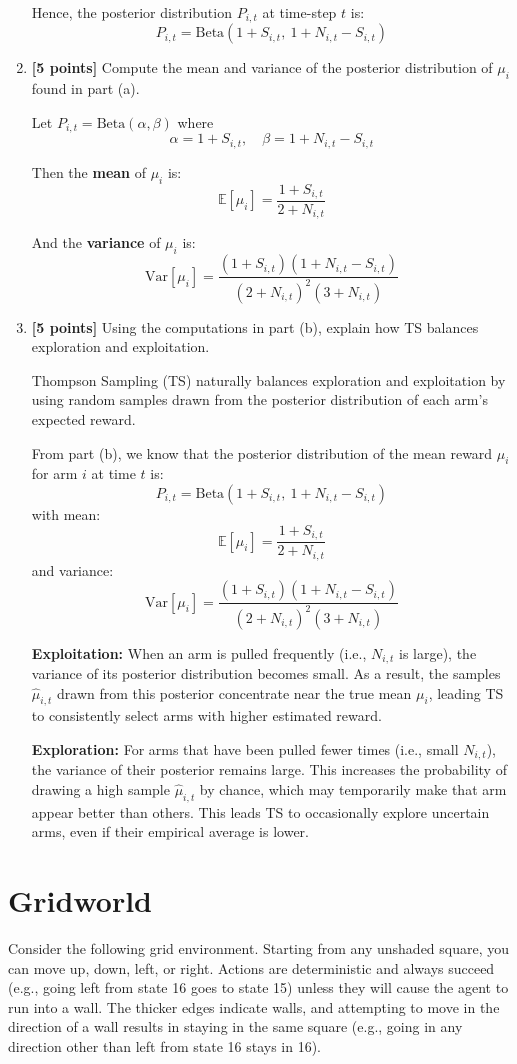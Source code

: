 \documentclass[a3paper,12pt]{extarticle} %
\begin{document}
\begin{enumerate}
Hence, the posterior distribution $P_{i,t}$ at time-step $t$ is:
\[
\boxed{
P_{i,t} = \text{Beta}(1 + S_{i,t},\ 1 + N_{i,t} - S_{i,t})
}
\]


    \item \textbf{[5 points]} Compute the mean and variance of the posterior distribution of $\mu_i$ found in part (a).

Let $P_{i,t} = \text{Beta}(\alpha, \beta)$ where
\[
\alpha = 1 + S_{i,t}, \quad \beta = 1 + N_{i,t} - S_{i,t}
\]

Then the \textbf{mean} of $\mu_i$ is:
\[
\mathbb{E}[\mu_i] = \frac{1 + S_{i,t}}{2 + N_{i,t}}
\]

And the \textbf{variance} of $\mu_i$ is:
\[
\text{Var}[\mu_i] = \frac{(1 + S_{i,t})(1 + N_{i,t} - S_{i,t})}{(2 + N_{i,t})^2 (3 + N_{i,t})}
\]


    \item \textbf{[5 points]} Using the computations in part (b), explain how TS balances exploration and exploitation.

Thompson Sampling (TS) naturally balances exploration and exploitation by using random samples drawn from the posterior distribution of each arm's expected reward.

From part (b), we know that the posterior distribution of the mean reward $\mu_i$ for arm $i$ at time $t$ is:
\[
P_{i,t} = \text{Beta}(1 + S_{i,t},\ 1 + N_{i,t} - S_{i,t})
\]
with mean:
\[
\mathbb{E}[\mu_i] = \frac{1 + S_{i,t}}{2 + N_{i,t}}
\]
and variance:
\[
\text{Var}[\mu_i] = \frac{(1 + S_{i,t})(1 + N_{i,t} - S_{i,t})}{(2 + N_{i,t})^2 (3 + N_{i,t})}
\]

\textbf{Exploitation:} When an arm is pulled frequently (i.e., $N_{i,t}$ is large), the variance of its posterior distribution becomes small. As a result, the samples $\hat{\mu}_{i,t}$ drawn from this posterior concentrate near the true mean $\mu_i$, leading TS to consistently select arms with higher estimated reward.

\textbf{Exploration:} For arms that have been pulled fewer times (i.e., small $N_{i,t}$), the variance of their posterior remains large. This increases the probability of drawing a high sample $\hat{\mu}_{i,t}$ by chance, which may temporarily make that arm appear better than others. This leads TS to occasionally explore uncertain arms, even if their empirical average is lower.



\end{enumerate}

\newpage
\section{Gridworld}
Consider the following grid environment. Starting from any unshaded square, you can move up, down, left, or right. Actions are deterministic and always succeed (e.g., going left from state 16 goes to state 15) unless they will cause the agent to run into a wall. The thicker edges indicate walls, and attempting to move in the direction of a wall results in staying in the same square (e.g., going in any direction other than left from state 16 stays in 16).
\end{document}
